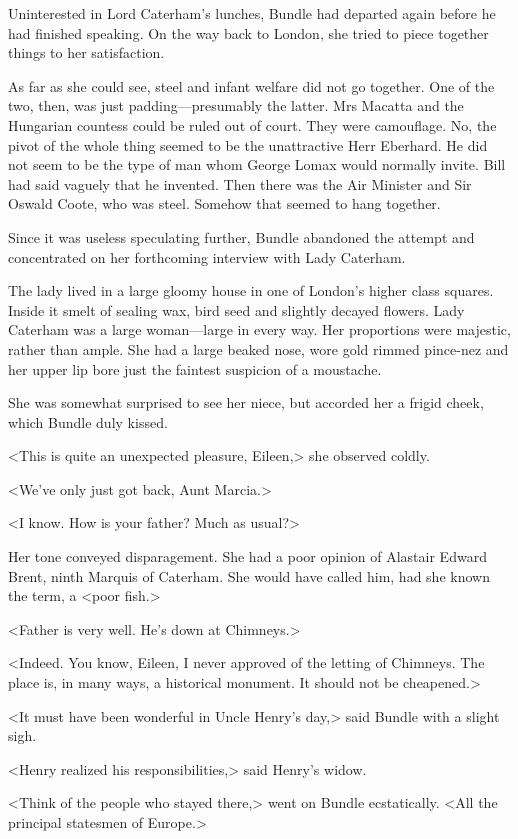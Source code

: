 Uninterested in Lord Caterham's lunches, Bundle had departed again before he had finished speaking. On the way back to London, she tried to piece together things to her satisfaction.

As far as she could see, steel and infant welfare did not go together. One of the two, then, was just padding—presumably the latter. Mrs Macatta and the Hungarian countess could be ruled out of court. They were camouflage. No, the pivot of the whole thing seemed to be the unattractive Herr Eberhard. He did not seem to be the type of man whom George Lomax would normally invite. Bill had said vaguely that he invented. Then there was the Air Minister and Sir Oswald Coote, who was steel. Somehow that seemed to hang together.

Since it was useless speculating further, Bundle abandoned the attempt and concentrated on her forthcoming interview with Lady Caterham.

The lady lived in a large gloomy house in one of London's higher class squares. Inside it smelt of sealing wax, bird seed and slightly decayed flowers. Lady Caterham was a large woman—large in every way. Her proportions were majestic, rather than ample. She had a large beaked nose, wore gold rimmed pince-nez and her upper lip bore just the faintest suspicion of a moustache.

She was somewhat surprised to see her niece, but accorded her a frigid cheek, which Bundle duly kissed.

<This is quite an unexpected pleasure, Eileen,> she observed coldly.

<We've only just got back, Aunt Marcia.>

<I know. How is your father? Much as usual?>

Her tone conveyed disparagement. She had a poor opinion of Alastair Edward Brent, ninth Marquis of Caterham. She would have called him, had she known the term, a <poor fish.>

<Father is very well. He's down at Chimneys.>

<Indeed. You know, Eileen, I never approved of the letting of Chimneys. The place is, in many ways, a historical monument. It should not be cheapened.>

<It must have been wonderful in Uncle Henry's day,> said Bundle with a slight sigh.

<Henry realized his responsibilities,> said Henry's widow.

<Think of the people who stayed there,> went on Bundle ecstatically. <All the principal statesmen of Europe.>

